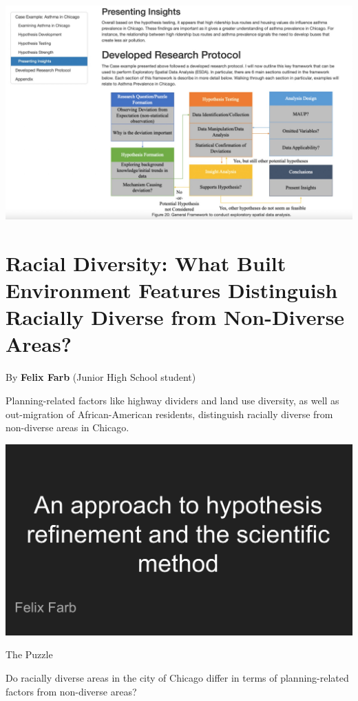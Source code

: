 \documentclass[
]{book}
\begin{document}
\includegraphics{images/asthma5.jpg}

\hypertarget{racial-diversity-what-built-environment-features-distinguish-racially-diverse-from-non-diverse-areas}{%
\section{Racial Diversity: What Built Environment Features Distinguish Racially Diverse from Non-Diverse Areas?}\label{racial-diversity-what-built-environment-features-distinguish-racially-diverse-from-non-diverse-areas}}

By \textbf{Felix Farb} (Junior High School student)

Planning-related factors like highway dividers and land use diversity, as well as out-migration of African-American residents, distinguish racially diverse from non-diverse areas in Chicago.

\includegraphics{images/racialdiversity1.png}

The Puzzle

Do racially diverse areas in the city of Chicago differ in terms of planning-related factors from non-diverse areas?
\end{document}
